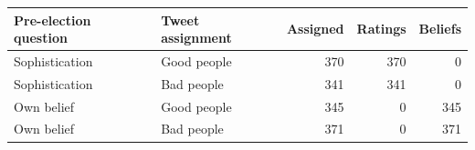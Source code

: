 \begin{tabular}{llrrr}
\toprule
Pre-election question & Tweet assignment & Assigned & Ratings & Beliefs \\
\midrule
Sophistication & Good people & 370 & 370 & 0 \\
Sophistication & Bad people & 341 & 341 & 0 \\
Own belief & Good people & 345 & 0 & 345 \\
Own belief & Bad people & 371 & 0 & 371 \\
\bottomrule
\end{tabular}
